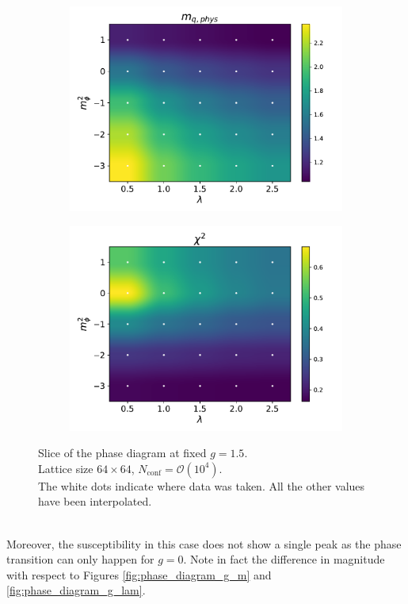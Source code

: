 \begin{figure}[hbp]
\begin{subfigure}[b]{0.47\textwidth}
    \end{subfigure}
    \begin{subfigure}[b]{0.47\textwidth}
        \includegraphics[width=\textwidth]{figures/phase_diagram/m-lam/phase_diagram_mqphys.pdf}
    \end{subfigure}
    \begin{subfigure}[b]{0.47\textwidth}
        \includegraphics[width=\textwidth]{figures/phase_diagram/m-lam/phase_diagram_chi2.pdf}
    \end{subfigure}
    \caption[Phase diagram in the $\lambda-m_\phi^2$ plane]{Slice of the phase diagram at fixed $g = 1.5$. \\ Lattice size $64 \times 64$, $N_\text{conf} = \mathcal{O}(10^4)$. \\ The white dots indicate where data was taken. All the other values have been interpolated.}
    \label{fig:phase_diagram_m_lam}
\end{figure}\\
Moreover, the susceptibility in this case does not show a single peak as the phase transition can only happen for $g=0$. Note in fact the difference in magnitude with respect to Figures \ref{fig:phase_diagram_g_m} and \ref{fig:phase_diagram_g_lam}.

